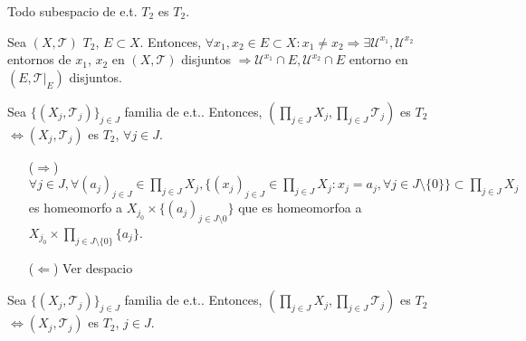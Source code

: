 \begin{prop}
  Todo subespacio de e.t. $T_{2}$ es $T_{2}$.
\end{prop}

\begin{dem}
  Sea $( X, \mathcal{T} )$ $T_{2}$, $E \subset X$. Entonces, $\forall x_{1}, x_{2} \in E \subset X : x_{1} \neq x_{2} \Rightarrow \exists \mathcal{U}^{x_{1}}, \mathcal{U}^{x_{2}}$ entornos de $x_{1}$, $x_{2}$ en $( X, \mathcal{T} )$ disjuntos $\Rightarrow \mathcal{U}^{x_{1}} \cap E, \mathcal{U}^{x_{2}} \cap E$ entorno en $(E, \mathcal{T}|_{E})$ disjuntos.
\end{dem}

\begin{prop}
  Sea $\{ ( X_{j}, \mathcal{T}_{j} ) \}_{j \in J}$ familia de e.t.. Entonces, $( \prod_{j \in J} X_{j}, \prod_{j \in J} \mathcal{T}_{j} )$ es $T_{2}$ $\Leftrightarrow ( X_{j}, \mathcal{T}_{j} )$ es $ T_{2}$, $\forall j \in J$.
\end{prop}

\begin{dem}
  \begin{enumerate}[label=(\roman*)]
    \item [($\Rightarrow$)] $\forall j \in J, \forall ( a_{j} )_{j \in J} \in \prod_{j \in J} X_{j}, \{ (x_{j})_{j \in J} \in \prod_{j \in J} X_{j} : x_{j} = a_{j}, \forall j \in J \setminus \{ 0 \} \} \subset \prod_{j \in J} X_{j}$ es homeomorfo a $X_{j_{0}} \times \{ ( a_{j} )_{j \in J \setminus {0}} \}$ que es homeomorfoa a $X_{j_{0}} \times \prod_{j \in J \setminus \{ 0 \}} \{ a_{j} \}$.
    \item [($\Leftarrow$)] Ver despacio
  \end{enumerate}
\end{dem}

\begin{prop}
    Sea $\{ ( X_{j}, \mathcal{T}_{j} ) \}_{j \in J}$ familia de e.t.. Entonces, $( \prod_{j \in J} X_{j}, \prod_{j \in J} \mathcal{T}_{j} )$ es $T_{2}$ $\Leftrightarrow ( X_{j}, \mathcal{T}_{j} )$ es $ T_{2}$, $j \in J$.
\end{prop}

